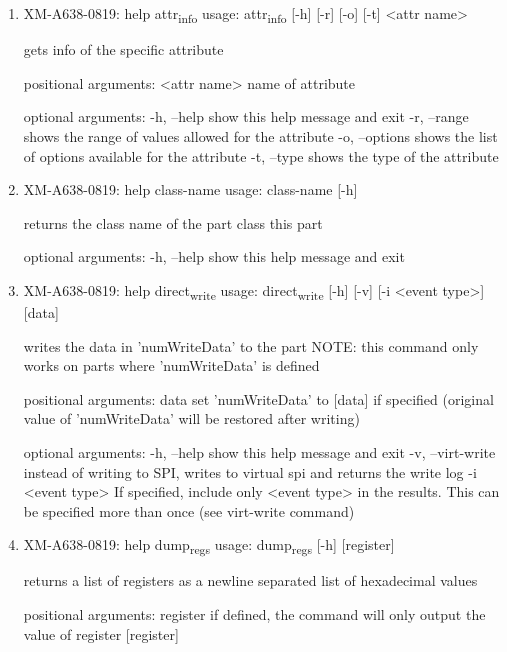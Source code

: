 \documentclass[11pt]{article}
\begin{document}
\begin{enumerate}
\item XM-A638-0819: help attr\textsubscript{info}
\label{sec:orga5d6ea4}
usage: attr\textsubscript{info} [-h] [-r] [-o] [-t] <attr name>

gets info of the specific attribute

positional arguments:
  <attr name>    name of attribute

optional arguments:
  -h, --help     show this help message and exit
  -r, --range    shows the range of values allowed for the attribute
  -o, --options  shows the list of options available for the attribute
  -t, --type     shows the type of the attribute

\item XM-A638-0819: help class-name
\label{sec:orga51a336}
usage: class-name [-h]

returns the class name of the part class this part

optional arguments:
  -h, --help  show this help message and exit

\item XM-A638-0819: help direct\textsubscript{write}
\label{sec:org07783df}
usage: direct\textsubscript{write} [-h] [-v] [-i <event type>] [data]

writes the data in 'numWriteData' to the part NOTE: this command only works on
parts where 'numWriteData' is defined

positional arguments:
  data              set 'numWriteData' to [data] if specified (original value
                    of 'numWriteData' will be restored after writing)

optional arguments:
  -h, --help        show this help message and exit
  -v, --virt-write  instead of writing to SPI, writes to virtual spi and
                    returns the write log
  -i <event type>   If specified, include only <event type> in the results.
                    This can be specified more than once (see virt-write
                    command)

\item XM-A638-0819: help dump\textsubscript{regs}
\label{sec:org3739d65}
usage: dump\textsubscript{regs} [-h] [register]

returns a list of registers as a newline separated list of hexadecimal values

positional arguments:
  register    if defined, the command will only output the value of register
              [register]


\end{enumerate}
\end{document}
